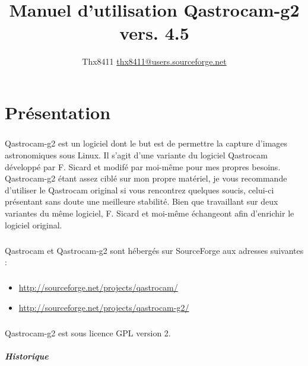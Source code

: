 \documentclass[11pt,a4paper]{book}
\title{Manuel d'utilisation Qastrocam-g2 vers. 4.5}
\author{Thx8411 \url{thx8411@users.sourceforge.net}}
\begin{document}
\maketitle

\tableofcontents

\chapter{Pr\'esentation}

\paragraph*{}
Qastrocam-g2 est un logiciel dont le but est de permettre la capture d'images
astronomiques sous Linux. Il s'agit d'une variante du logiciel Qastrocam d\'evelopp\'e
par F. Sicard et modif\'e par moi-m\^eme pour mes propres besoins. Qastrocam-g2 \'etant
assez cibl\'e sur mon propre mat\'eriel, je vous recommande d'utiliser le Qastrocam
original si vous rencontrez quelques soucis, celui-ci pr\'esentant sans doute une
meilleure stabilit\'e. Bien que travaillant sur deux variantes du m\^eme logiciel, F.
Sicard et moi-m\^eme \'echangeont afin d'enrichir le logiciel original.

\paragraph*{}
Qastrocam et Qastrocam-g2 sont h\'eberg\'es sur SourceForge aux adresses suivantes :

\paragraph*{}
\begin{itemize}
\item \url{http://sourceforge.net/projects/qastrocam/}
\item \url{http://sourceforge.net/projects/qastrocam-g2/}
\end{itemize}

\paragraph*{}
Qastrocam-g2 est sous licence GPL version 2.

\paragraph*{Historique}
\end{document}
